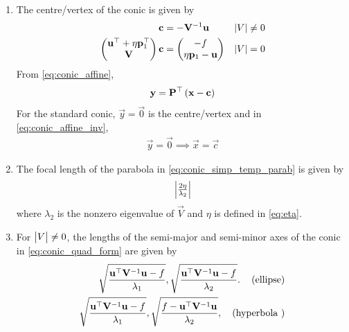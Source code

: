 \documentclass[journal,12pt,twocolumn]{IEEEtran}
\renewcommand\thesection{\arabic{section}}
\renewcommand\thesubsection{\thesection.\arabic{subsection}}
\begin{document}
\begin{enumerate}[label=\thesubsection.\arabic*.,ref=\thesubsection.\theenumi]
\item The centre/vertex of the conic is given by 
  \begin{align}
    \label{eq:conic_nonparab_c}
    \mathbf{c} &= - \mathbf{V}^{-1}\mathbf{u} & \left\vert V\right\vert &\ne 0
    \\
    \begin{pmatrix} \mathbf{u}^{\top}+\eta\mathbf{p}_1^{\top} \\ \mathbf{V}\end{pmatrix}\mathbf{c} &= \begin{pmatrix}-f \\ \eta\mathbf{p}_1-\mathbf{u}\end{pmatrix}  &\left\vert V\right\vert &= 0
    \label{eq:conic_parab_c}
    \end{align}      
    \solution From \eqref{eq:conic_affine},
\begin{align}
\label{eq:conic_affine_inv}
\mathbf{y} = \mathbf{P}^{\top}\left(\mathbf{x}-\mathbf{c}\right)
\end{align}
For the standard conic, $\vec{y} = \vec{0} $ is the centre/vertex and in \eqref{eq:conic_affine_inv}, 
\begin{align}
\label{eq:conic_centre}
\vec{y} = \vec{0} \implies \vec{x}=\vec{c}
\end{align}
\item The focal length of the parabola in \eqref{eq:conic_simp_temp_parab} is given by 
  \begin{align}
    \begin{vmatrix}\frac{2\eta}{\lambda_2}\end{vmatrix} 
    \label{eq:conic_parab_foc_len} 
    \end{align}    
    where $\lambda_2$ is the nonzero eigenvalue of $\vec{V}$ and $\eta$ is defined in \eqref{eq:eta}.
    \item For $\begin{vmatrix}V\end{vmatrix} \ne 0$, the lengths of the semi-major and semi-minor axes of the conic in \eqref{eq:conic_quad_form} are given by 
  \begin{align} 
    \label{eq:ellipse_axes}
    \sqrt{\frac{\vec{u}^{\top}\vec{V}^{-1}\vec{u} -f}{\lambda_1}}, 
    \sqrt{\frac{\vec{u}^{\top}\vec{V}^{-1}\vec{u} -f}{\lambda_2}}. \quad \brak{\text{ellipse}}
    \\
%
       \sqrt{\frac{\vec{u}^{\top}\vec{V}^{-1}\vec{u} -f}{\lambda_1}}, 
       \sqrt{\frac{f-\vec{u}^{\top}\vec{V}^{-1}\vec{u}}{\lambda_2}}, \quad \brak{\text{hyperbola }}
%

\end{align}
\end{enumerate}
\end{document}
